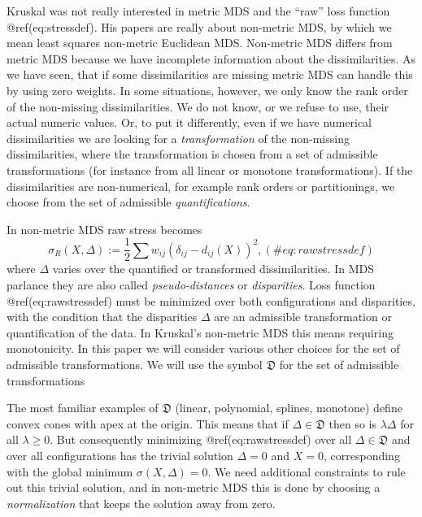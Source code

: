 \documentclass[
  12pt,
  letterpaper,
  DIV=11,
  numbers=noendperiod]{scrartcl}
\theoremstyle{plain}
\theoremstyle{remark}
\begin{document}
Kruskal was not really interested in metric MDS and the ``raw'' loss
function @ref(eq:stressdef). His papers are really about non-metric MDS,
by which we mean least squares non-metric Euclidean MDS. Non-metric MDS
differs from metric MDS because we have incomplete information about the
dissimilarities. As we have seen, that if some dissimilarities are
missing metric MDS can handle this by using zero weights. In some
situations, however, we only know the rank order of the non-missing
dissimilarities. We do not know, or we refuse to use, their actual
numeric values. Or, to put it differently, even if we have numerical
dissimilarities we are looking for a \emph{transformation} of the
non-missing dissimilarities, where the transformation is chosen from a
set of admissible transformations (for instance from all linear or
monotone transformations). If the dissimilarities are non-numerical, for
example rank orders or partitionings, we choose from the set of
admissible \emph{quantifications}.

In non-metric MDS raw stress becomes \begin{equation}
\sigma_R(X,\Delta):=\frac12\sum w_{ij}(\delta_{ij}-d_{ij}(X))^2,
(\#eq:rawstressdef)
\end{equation} where \(\Delta\) varies over the quantified or
transformed dissimilarities. In MDS parlance they are also called
\emph{pseudo-distances} or \emph{disparities}. Loss function
@ref(eq:rawstressdef) must be minimized over both configurations and
disparities, with the condition that the disparities \(\Delta\) are an
admissible transformation or quantification of the data. In Kruskal's
non-metric MDS this means requiring monotonicity. In this paper we will
consider various other choices for the set of admissible
transformations. We will use the symbol \(\mathfrak{D}\) for the set of
admissible transformations

The most familiar examples of \(\mathfrak{D}\) (linear, polynomial,
splines, monotone) define convex cones with apex at the origin. This
means that if \(\Delta\in\mathfrak{D}\) then so is \(\lambda\Delta\) for
all \(\lambda\geq 0\). But consequently minimizing @ref(eq:rawstressdef)
over all \(\Delta\in\mathfrak{D}\) and over all configurations has the
trivial solution \(\Delta=0\) and \(X=0\), corresponding with the global
minimum \(\sigma(X,\Delta)=0\). We need additional constraints to rule
out this trivial solution, and in non-metric MDS this is done by
choosing a \emph{normalization} that keeps the solution away from zero.
\end{document}
